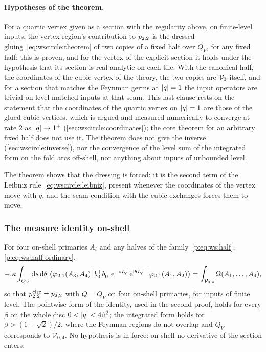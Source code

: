 \paragraph{Hypotheses of the theorem.}
For a quartic vertex given as a section with the regularity above, on finite-level inputs, the vertex region's contribution to $p_{2,2}$ is the dressed gluing~\eqref{eq:wscircle:theorem} of two copies of a fixed half over $Q_V$, for any fixed half: this is proven, and for the vertex of the explicit section it holds under the hypothesis that its section is real-analytic on each tile.
With the canonical half, the coordinates of the cubic vertex of the theory, the two copies are $\mathcal{V}_{3}$ itself, and for a section that matches the Feynman germs at ${|q|} = 1$ the input operators are trivial on level-matched inputs at that seam.
This last clause rests on the statement that the coordinates of the quartic vertex on ${|q|} = 1$ are those of the glued cubic vertices, which is argued and measured numerically to converge at rate $2$ as ${|q|} \to 1^+$ (\cref{sec:wscircle:coordinates}); the core theorem for an arbitrary fixed half does not use it.
The theorem does not give the inverse (\cref{sec:wscircle:inverse}), nor the convergence of the level sum of the integrated form on the fold arcs off-shell, nor anything about inputs of unbounded level.

The theorem shows that the dressing is forced: it is the second term of the Leibniz rule~\eqref{eq:wscircle:leibniz}, present whenever the coordinates of the vertex move with $q$, and the seam condition with the cubic exchanges forces them to move.

\subsubsection{The measure identity on-shell}
\label{sec:wscircle:measure}


For four on-shell primaries $A_i$ and any halves of the family~\eqref{p:eq:ws:half}, \eqref{p:eq:ws:half-ordinary},
\begin{equation}
  \label{eq:wscircle:measure-identity}
  - \mathrm{i} \kappa \int_{Q_V} \mathrm{d} s \, \mathrm{d}\theta \; \big\langle \varphi_{2,1}(A_3, A_4) \big| \, b_0^+ b_0^- \, \mathrm{e}^{- s L_0^+} \mathrm{e}^{\mathrm{i} \theta L_0^-} \, \big| \varphi_{2,1}(A_1, A_2) \big\rangle
    = \int_{\mathcal V_{0,4}} \Omega(A_1, \dots, A_4),
\end{equation}
so that $p_{2,2}^{\mathrm{circ}} = p_{2,2}$ with $Q = Q_V$ on four on-shell primaries, for inputs of finite level.
The pointwise form of the identity, used in the second proof, holds for every $\beta$ on the whole disc $0 < {|q|} < 4 \beta^2$; the integrated form holds for $\beta > (1 + \sqrt 2) / 2$, where the Feynman regions do not overlap and $Q_V$ corresponds to $\mathcal V_{0,4}$.
No hypothesis is in force: on-shell no derivative of the section enters.

